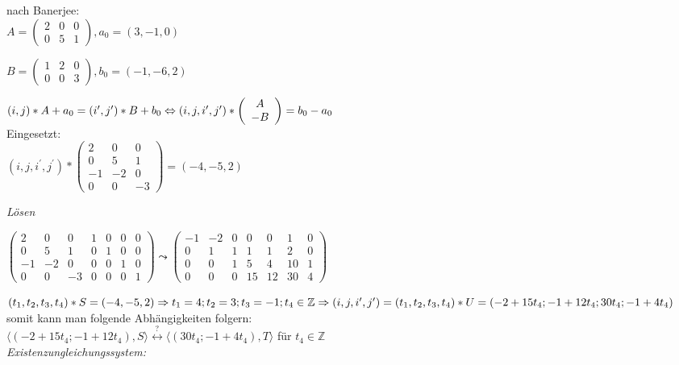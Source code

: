 nach Banerjee:\\

$A=
\left(
\begin{array}{ccc}
2 & 0 & 0\\
0 & 5 & 1
\end{array}
\right), a_0 = (3,-1,0)$

$B=
\left(
\begin{array}{ccc}
1 & 2 & 0\\
0 & 0 & 3
\end{array}
\right), b_0 = (-1, -6, 2)$


$(i,j) * A + a_0 = (i^\prime, j^\prime) * B + b_0 \\
\Leftrightarrow
(i,j,i^\prime,j^\prime) * 
\left(
\begin{array}{c}
A\\
-B
\end{array}
\right)
= b_0 - a_0$\\
Eingesetzt:\\
$(i,j,i^\prime,j^\prime) * 
\left(
\begin{array}{ccc}
2 & 0 & 0\\
0 & 5 & 1\\
-1&-2 & 0\\
0 & 0 &-3
\end{array}
\right)
= (-4,-5,2)$

\textit{Lösen}

$\left(
\begin{array}{ccc|cccc}
 2 & 0 & 0 & 1 & 0 & 0 & 0 \\
 0 & 5 & 1 & 0 & 1 & 0 & 0 \\
-1 &-2 & 0 & 0 & 0 & 1 & 0 \\
 0 & 0 &-3 & 0 & 0 & 0 & 1
\end{array}
\right) \leadsto \left(
\begin{array}{ccc|cccc}
-1 &-2 & 0 & 0 & 0 & 1 & 0 \\
 0 & 1 & 1 & 1 & 1 & 2 & 0 \\
 0 & 0 & 1 & 5 & 4 &10 & 1 \\
 0 & 0 & 0 &15 &12 &30 & 4
\end{array}
\right)$


$(t_1,t_2,t_3,t_4) * S = (-4, -5, 2) \\
\Rightarrow t_1 = 4; t_2= 3; t_3 = -1; t_4 \in \mathbb{Z} \\
\Rightarrow (i,j,i^\prime,j^\prime) = (t_1,t_2,t_3,t_4) * U =
(-2+15t_4; -1+12t_4; 30t_4; -1+4t_4)$
somit kann man folgende Abhängigkeiten folgern:\\
$\langle (-2 + 15t_4; -1+12t_4), S \rangle \stackrel{?}{\leftrightarrow}
 \langle (30t_4;-1+4t_4), T \rangle$ für $t_4 \in \mathbb{Z}$ 
~\\
\textit{Existenzungleichungssystem:}\\

